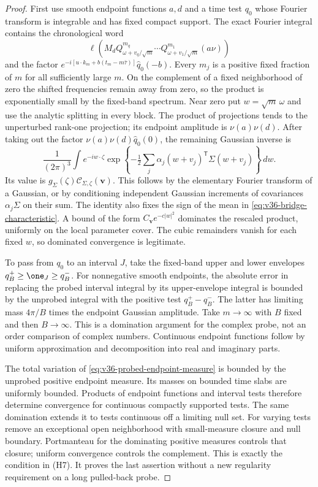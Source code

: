 \begin{proof}
First use smooth endpoint functions $a,d$ and a time test $q_0$ whose
Fourier transform is integrable and has fixed compact support.
The exact Fourier integral contains the chronological word
\begin{equation}\label{eq:v36-probe-product}
 \ell\left(M_d Q_{\omega+v_q/\sqrt m}^{m_q}\cdots
               Q_{\omega+v_1/\sqrt m}^{m_1}(a\nu)\right)
\end{equation}
and the factor
$e^{-i[u\cdot k_m+b(t_m-m\bar\tau)]}\widehat q_0(-b)$.
Every $m_j$ is a positive fixed fraction of $m$ for all sufficiently
large $m$. On the complement of a fixed neighborhood of zero the
shifted frequencies remain away from zero, so the product is
exponentially small by the fixed-band spectrum. Near zero put
$w=\sqrt m\,\omega$ and use the analytic splitting in every block.
The product of projections tends to the unperturbed rank-one
projection; its endpoint amplitude is $\nu(a)\nu(d)$.
After taking out the factor $\nu(a)\nu(d)\widehat q_0(0)$,
the remaining Gaussian inverse is
\[
 \frac1{(2\pi)^3}\int e^{-iw\cdot\zeta}
      \exp\left\{-\tfrac12\sum_j\alpha_j
                        (w+v_j)^{\mathsf T}\Sigma(w+v_j)\right\}\,dw.
\]
Its value is $g_\Sigma(\zeta)\mathcal C_{\Sigma,\zeta}(\mathbf v)$.
This follows by the elementary Fourier transform of a Gaussian,
or by conditioning independent Gaussian increments of covariances
$\alpha_j\Sigma$ on their sum. The identity also fixes the sign of
the mean in \eqref{eq:v36-bridge-characteristic}. A bound of the form
$C_{\mathbf v}e^{-c|w|^2}$ dominates the rescaled product, uniformly
on the local parameter cover. The cubic remainders vanish for each
fixed $w$, so dominated convergence is legitimate.

To pass from $q_0$ to an interval $J$, take the fixed-band upper and
lower envelopes $q_B^+\ge\one_J\ge q_B^-$. For nonnegative smooth
endpoints, the absolute error in replacing the probed interval integral
by its upper-envelope integral is bounded by the unprobed integral
with the positive test $q_B^+-q_B^-$. The latter has limiting mass
$4\pi/B$ times the endpoint Gaussian amplitude. Take $m\to\infty$
with $B$ fixed and then $B\to\infty$. This is a domination argument
for the complex probe, not an order comparison of complex numbers.
Continuous endpoint functions follow by uniform approximation and
decomposition into real and imaginary parts.

The total variation of \eqref{eq:v36-probed-endpoint-measure} is
bounded by the unprobed positive endpoint measure. Its masses on
bounded time slabs are uniformly bounded. Products of endpoint
functions and interval tests therefore determine convergence for
continuous compactly supported tests. The same domination extends it
to tests continuous off a limiting null set. For varying tests remove
an exceptional open neighborhood with small-measure closure and null
boundary. Portmanteau for the dominating positive measures controls
that closure; uniform convergence controls the complement. This is
exactly the condition in \textup{(H7)}. It proves the last assertion
without a new regularity requirement on a long pulled-back probe.
\end{proof}

